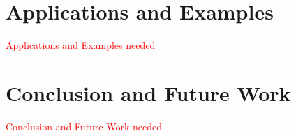 \documentclass[letterpaper, 10 pt, conference]{ieeeconf}
\providecommand{\note}{\textcolor{red}} %
\begin{document}
\section{Applications and Examples} \label{sec:applicationsAndExamples}
\note{Applications and Examples needed}

\section{Conclusion and Future Work} \label{sec:conclusionAndFutureWork}
\note{Conclusion and Future Work needed}

%

\end{document}
